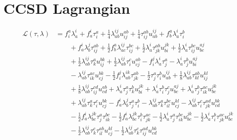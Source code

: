 \section{CCSD Lagrangian}
\label{app:ccsd_lagrangian}

\begin{equation}
    \begin{aligned}
    \mathscr{L}(\tau, \lambda)
    &=
    f^{a}_{i} \lambda^{i}_{a}
    + f^{i}_{a} \tau^{a}_{i}
    + \frac{1}{4}\lambda^{ij}_{ab} u^{ab}_{ij}
    + \frac{1}{4}\tau^{ab}_{ij} u^{ij}_{ab}
    + f^{a}_{b} \lambda^{i}_{a} \tau^{b}_{i}
    \\
    &\qquad
    + f^{i}_{a} \lambda^{j}_{b} \tau^{ab}_{ij}
    + \frac{1}{2}f^{a}_{b} \lambda^{ij}_{ac} \tau^{bc}_{ij}
    + \frac{1}{2}\lambda^{i}_{a} \tau^{ab}_{jk} u^{jk}_{bi}
    + \frac{1}{2}\lambda^{i}_{a} \tau^{bc}_{ij} u^{aj}_{bc}
    \\
    &\qquad
    + \frac{1}{2}\lambda^{ij}_{ab} \tau^{a}_{k} u^{bk}_{ij}
    + \frac{1}{2}\lambda^{ij}_{ab} \tau^{c}_{i} u^{ab}_{cj}
    - f^{j}_{i} \lambda^{i}_{a} \tau^{a}_{j}
    - \lambda^{i}_{a} \tau^{b}_{j} u^{aj}_{bi}
    \\
    &\qquad
    - \lambda^{ij}_{ab} \tau^{ac}_{ik} u^{bk}_{cj}
    - \frac{1}{2}f^{j}_{i} \lambda^{ik}_{ab} \tau^{ab}_{jk}
    - \frac{1}{2}\tau^{a}_{j} \tau^{b}_{i} u^{ij}_{ab}
    + \frac{1}{8}\lambda^{ij}_{ab} \tau^{ab}_{kl} u^{kl}_{ij}
    \\
    &\qquad
    + \frac{1}{8}\lambda^{ij}_{ab} \tau^{cd}_{ij} u^{ab}_{cd}
    + \lambda^{i}_{a} \tau^{a}_{j} \tau^{b}_{k} u^{jk}_{bi}
    + \lambda^{i}_{a} \tau^{b}_{i} \tau^{c}_{j} u^{aj}_{bc}
    + \lambda^{i}_{a} \tau^{b}_{j} \tau^{ac}_{ik} u^{jk}_{bc}
    \\
    &\qquad
    + \lambda^{ij}_{ab} \tau^{a}_{k} \tau^{c}_{i} u^{bk}_{cj}
    - f^{i}_{a} \lambda^{j}_{b} \tau^{a}_{j} \tau^{b}_{i}
    - \lambda^{ij}_{ab} \tau^{a}_{k} \tau^{bc}_{il} u^{kl}_{cj}
    - \lambda^{ij}_{ab} \tau^{c}_{i} \tau^{ad}_{jk} u^{bk}_{cd}
    \\
    &\qquad
    - \frac{1}{2}f^{i}_{a} \lambda^{jk}_{bc} \tau^{a}_{j} \tau^{bc}_{ik}
    - \frac{1}{2}f^{i}_{a} \lambda^{jk}_{bc} \tau^{b}_{i} \tau^{ac}_{jk}
    - \frac{1}{2}\lambda^{i}_{a} \tau^{a}_{j} \tau^{bc}_{ik} u^{jk}_{bc}
    - \frac{1}{2}\lambda^{i}_{a} \tau^{b}_{i} \tau^{ac}_{jk} u^{jk}_{bc}
    \\
    &\qquad
    - \frac{1}{2}\lambda^{ij}_{ab} \tau^{c}_{k} \tau^{ab}_{il} u^{kl}_{cj}
    - \frac{1}{2}\lambda^{ij}_{ab} \tau^{c}_{k} \tau^{ad}_{ij} u^{bk}_{cd}

\end{aligned}
\end{equation}
